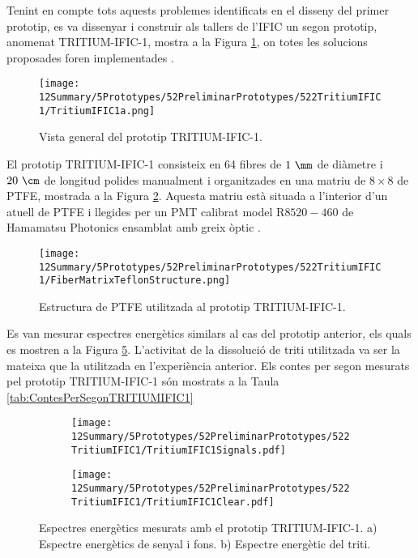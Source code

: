 Tenint en compte tots aquests problemes identificats en el disseny del primer prototip, es va dissenyar i construir als tallers de l'IFIC un segon prototip, anomenat TRITIUM-IFIC-1, mostra a la Figura \ref{fig:TritumIFIC1}, on totes les solucions proposades foren implementades .

\begin{figure}[h]
\centering
\texttt{[image: 12Summary/5Prototypes/52PreliminarPrototypes/522TritiumIFIC1/TritiumIFIC1a.png]}
\caption{Vista general del prototip TRITIUM-IFIC-1.\label{fig:TritumIFIC1}}
\end{figure}

El prototip TRITIUM-IFIC-1 consisteix en 64 fibres de $1~\mm$ de diàmetre i $20~\cm$ de longitud polides manualment i organitzades en una matriu de $8\times 8$ de PTFE, mostrada a la Figura \ref{fig:EstructuraPTFEFibresTritiumIFIC1}. Aquesta matriu està situada a l'interior d'un atuell de PTFE i llegides per un PMT calibrat model R$8520-460$ de Hamamatsu Photonics \cite{DataSheetPMTs} ensamblat amb greix òptic \cite{OpticalGrease}.

\begin{figure}[h]
\centering
\texttt{[image: 12Summary/5Prototypes/52PreliminarPrototypes/522TritiumIFIC1/FiberMatrixTeflonStructure.png]}
\caption{Estructura de PTFE utilitzada al prototip TRITIUM-IFIC-1.\label{fig:EstructuraPTFEFibresTritiumIFIC1}}
\end{figure}

Es van mesurar espectres energètics similars al cas del prototip anterior, els quals es mostren a la Figura \ref{fig:EspectresEnergeticsTRITIUMIFIC1}. L'activitat de la dissolució de triti utilitzada va ser la mateixa que la utilitzada en l'experiència anterior. Els contes per segon mesurats pel prototip TRITIUM-IFIC-1 són mostrats a la Taula \ref{tab:ContesPerSegonTRITIUMIFIC1}

\begin{figure}
\centering
    \begin{subfigure}[b]{1\textwidth}
    \centering
    \texttt{[image: 12Summary/5Prototypes/52PreliminarPrototypes/522TritiumIFIC1/TritiumIFIC1Signals.pdf]}  
    \caption{\label{subfig:EspectreEnergeticSenyalFonsTritiumIFIC1}}
    \end{subfigure}
    \hfill
    \begin{subfigure}[b]{1\textwidth}
    \centering
    \texttt{[image: 12Summary/5Prototypes/52PreliminarPrototypes/522TritiumIFIC1/TritiumIFIC1Clear.pdf]}  
    \caption{\label{subfig:EspectreEnergeticTritiTritiumIFIC1}}
    \end{subfigure}
 \caption{Espectres energètics mesurats amb el prototip TRITIUM-IFIC-1. a) Espectre energètics de senyal i fons. b) Espectre energètic del triti.}
 \label{fig:EspectresEnergeticsTRITIUMIFIC1}
\end{figure}

